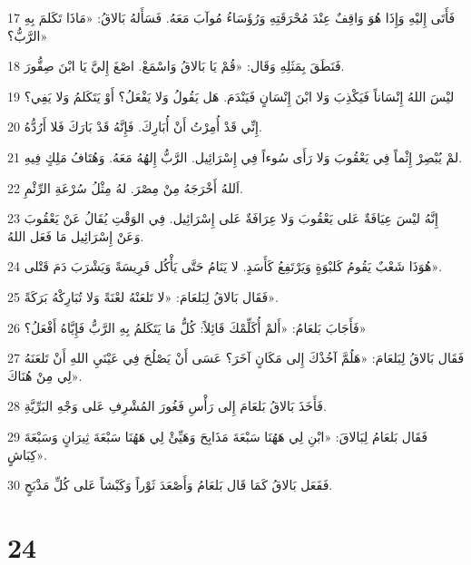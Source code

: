 \par 17 فَأَتَى إِليْهِ وَإِذَا هُوَ وَاقِفٌ عِنْدَ مُحْرَقَتِهِ وَرُؤَسَاءُ مُوآبَ مَعَهُ. فَسَأَلهُ بَالاقُ: «مَاذَا تَكَلمَ بِهِ الرَّبُّ؟»
\par 18 فَنَطَقَ بِمَثَلِهِ وَقَال: «قُمْ يَا بَالاقُ وَاسْمَعْ. اصْغَ إِليَّ يَا ابْنَ صِفُّورَ.
\par 19 ليْسَ اللهُ إِنْسَاناً فَيَكْذِبَ وَلا ابْنَ إِنْسَانٍ فَيَنْدَمَ. هَل يَقُولُ وَلا يَفْعَلُ؟ أَوْ يَتَكَلمُ وَلا يَفِي؟
\par 20 إِنِّي قَدْ أُمِرْتُ أَنْ أُبَارِكَ. فَإِنَّهُ قَدْ بَارَكَ فَلا أَرُدُّهُ.
\par 21 لمْ يُبْصِرْ إِثْماً فِي يَعْقُوبَ وَلا رَأَى سُوءاً فِي إِسْرَائِيل. الرَّبُّ إِلهُهُ مَعَهُ. وَهُتَافُ مَلِكٍ فِيهِ.
\par 22 اَللهُ أَخْرَجَهُ مِنْ مِصْرَ. لهُ مِثْلُ سُرْعَةِ الرِّئْمِ.
\par 23 إِنَّهُ ليْسَ عِيَافَةٌ عَلى يَعْقُوبَ وَلا عِرَافَةٌ عَلى إِسْرَائِيل. فِي الوَقْتِ يُقَالُ عَنْ يَعْقُوبَ وَعَنْ إِسْرَائِيل مَا فَعَل اللهُ.
\par 24 هُوَذَا شَعْبٌ يَقُومُ كَلبْوَةٍ وَيَرْتَفِعُ كَأَسَدٍ. لا يَنَامُ حَتَّى يَأْكُل فَرِيسَةً وَيَشْرَبَ دَمَ قَتْلى».
\par 25 فَقَال بَالاقُ لِبَلعَامَ: «لا تَلعَنْهُ لعْنَةً وَلا تُبَارِكْهُ بَرَكَةً».
\par 26 فَأَجَابَ بَلعَامُ: «أَلمْ أُكَلِّمْكَ قَائِلاً: كُلُّ مَا يَتَكَلمُ بِهِ الرَّبُّ فَإِيَّاهُ أَفْعَلُ؟»
\par 27 فَقَال بَالاقُ لِبَلعَامَ: «هَلُمَّ آخُذْكَ إِلى مَكَانٍ آخَرَ؟ عَسَى أَنْ يَصْلُحَ فِي عَيْنَيِ اللهِ أَنْ تَلعَنَهُ لِي مِنْ هُنَاكَ».
\par 28 فَأَخَذَ بَالاقُ بَلعَامَ إِلى رَأْسِ فَغُورَ المُشْرِفِ عَلى وَجْهِ البَرِّيَّةِ.
\par 29 فَقَال بَلعَامُ لِبَالاقَ: «ابْنِ لِي هَهُنَا سَبْعَةَ مَذَابِحَ وَهَيِّئْ لِي هَهُنَا سَبْعَةَ ثِيرَانٍ وَسَبْعَةَ كِبَاشٍ».
\par 30 فَفَعَل بَالاقُ كَمَا قَال بَلعَامُ وَأَصْعَدَ ثَوْراً وَكَبْشاً عَلى كُلِّ مَذْبَحٍ.

\chapter{24}

